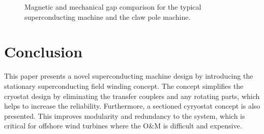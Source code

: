\documentclass[12pt]{iopart}
\begin{document}
\begin{figure}[]
  \centering
  \hspace{0.5in}
    \caption{Magnetic and mechanical gap comparison for the typical superconducting machine and the claw pole machine.} 
    \label{magnetic_mechanical_gap}
\end{figure}


\section{Conclusion}

This paper presents a novel superconducting machine design by introducing the stationary superconducting field winding concept. The concept simplifies the cryostat design by eliminating the transfer couplers and any rotating parts, which helps to increase the reliability. Furthermore, a sectioned cyryostat concept is also presented. This improves modularity and redundancy to the system, which is critical for offshore wind turbines where the O\&M is difficult and expensive.
\end{document}
